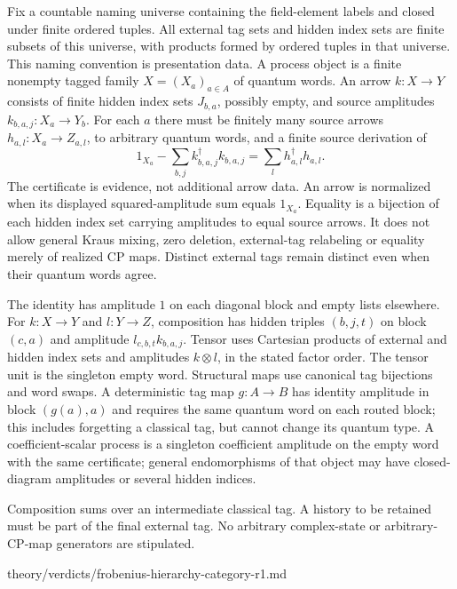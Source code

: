 \begin{definition}
Fix a countable naming universe containing the field-element labels and
closed under finite ordered tuples. All external tag sets and hidden index
sets are finite subsets of this universe, with products formed by ordered
tuples in that universe. This naming convention is presentation data.
A process object is a finite nonempty tagged family $X=(X_a)_{a\in A}$ of
quantum words. An arrow $k:X\to Y$ consists of finite hidden index sets
$J_{b,a}$, possibly empty, and source amplitudes
$k_{b,a,j}:X_a\to Y_b$. For each $a$ there must be finitely many source
arrows $h_{a,l}:X_a\to Z_{a,l}$, to arbitrary quantum words, and a finite
source derivation of
\[
 1_{X_a}-\sum_{b,j}k_{b,a,j}^\dagger k_{b,a,j}
       =\sum_lh_{a,l}^\dagger h_{a,l}.
\]
The certificate is evidence, not additional arrow data. An arrow is
normalized when its displayed squared-amplitude sum equals $1_{X_a}$.
Equality is a bijection of each hidden index set carrying amplitudes to
equal source arrows. It does not allow general Kraus mixing, zero deletion,
external-tag relabeling or equality merely of realized CP maps. Distinct
external tags remain distinct even when their quantum words agree.

The identity has amplitude $1$ on each diagonal block and empty lists
elsewhere. For $k:X\to Y$ and $l:Y\to Z$, composition has hidden triples
$(b,j,t)$ on block $(c,a)$ and amplitude $l_{c,b,t}k_{b,a,j}$.
Tensor uses Cartesian products of external and hidden index sets and
amplitudes $k\otimes l$, in the stated factor order. The tensor unit is
the singleton empty word. Structural maps use canonical tag bijections
and word swaps. A deterministic tag map $g:A\to B$ has identity amplitude
in block $(g(a),a)$ and requires the same quantum word on each routed
block; this includes forgetting a classical tag, but cannot change its
quantum type. A coefficient-scalar process is a singleton coefficient
amplitude on the empty word with the same certificate; general endomorphisms
of that object may have closed-diagram amplitudes or several hidden indices.
\end{definition}
\begin{scope}
Composition sums over an intermediate classical tag. A history to be retained
must be part of the final external tag. No arbitrary complex-state or
arbitrary-CP-map generators are stipulated.
\end{scope}
{theory/verdicts/frobenius-hierarchy-category-r1.md}

